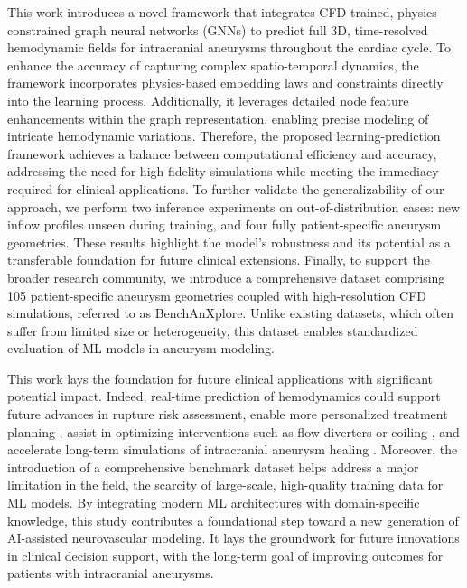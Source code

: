 This work introduces a novel framework that integrates CFD-trained, physics-constrained graph neural networks (GNNs) to predict full 3D, time-resolved hemodynamic fields for intracranial aneurysms throughout the cardiac cycle. To enhance the accuracy of capturing complex spatio-temporal dynamics, the framework incorporates physics-based embedding laws and constraints directly into the learning process. Additionally, it leverages detailed node feature enhancements within the graph representation, enabling precise modeling of intricate hemodynamic variations. Therefore, the proposed learning-prediction framework achieves a balance between computational efficiency and accuracy, addressing the need for high-fidelity simulations while meeting the immediacy required for clinical applications. To further validate the generalizability of our approach, we perform two inference experiments on out-of-distribution cases: new inflow profiles unseen during training, and four fully patient-specific aneurysm geometries. These results highlight the model’s robustness and its potential as a transferable foundation for future clinical extensions. Finally, to support the broader research community, we introduce a comprehensive dataset comprising 105 patient-specific aneurysm geometries coupled with high-resolution CFD simulations, referred to as BenchAnXplore. Unlike existing datasets, which often suffer from limited size or heterogeneity, this dataset enables standardized evaluation of ML models in aneurysm modeling. 

This work lays the foundation for future clinical applications with significant potential impact. Indeed, real-time prediction of hemodynamics could support future advances in rupture risk assessment, enable more personalized treatment planning \cite{hachem_reinforcement_2023}, assist in optimizing interventions such as flow diverters or coiling \cite{chong_multicenter_2019}, and accelerate long-term simulations of intracranial aneurysm healing \cite{pelissier_continuum_2025}. Moreover, the introduction of a comprehensive benchmark dataset helps address a major limitation in the field, the scarcity of large-scale, high-quality training data for ML models. By integrating modern ML architectures with domain-specific knowledge, this study contributes a foundational step toward a new generation of AI-assisted neurovascular modeling. It lays the groundwork for future innovations in clinical decision support, with the long-term goal of improving outcomes for patients with intracranial aneurysms.
